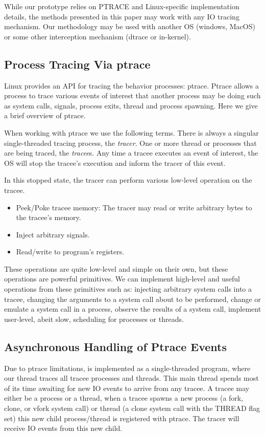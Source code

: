 While our prototype relies on PTRACE and Linux-specific implementation details, the methods presented in this paper may work with any IO tracing mechanism. Our methodology may be used with another OS (windows, MacOS) or some other interception mechanism (dtrace or in-kernel).

\subsection{Process Tracing Via ptrace}
Linux provides an API for tracing the behavior processes: ptrace. Ptrace allows a process to trace various
events of interest that another process may be doing such as system calls, signals, process exits,
thread and process spawning. Here we give a brief overview of ptrace.

When working with ptrace we use the following terms. There is always a singular single-threaded tracing process, the \textit{tracer}. One or more thread or processes that are being traced, the \textit{tracee}s. Any time a tracee executes an event of interest, the OS will stop the tracee's execution and inform the tracer of this event.

In this stopped state, the tracer can perform various low-level operation on the tracee.
\begin{itemize}
  \item Peek/Poke tracee memory: The tracer may read or write arbitrary bytes to the tracee's memory.
  \item Inject arbitrary signals.
  \item Read/write to program's registers.
\end{itemize}

These operations are quite low-level and simple on their own, but these operations are powerful
primitives. We can implement high-level and useful operations from these primitives such as:
injecting arbitrary system calls into a tracee, changing the arguments to a system call about to
be performed, change or emulate a system call in a process, observe the results of a system call,
implement user-level, abeit slow, scheduling for processes or threads.

\subsection{Asynchronous Handling of Ptrace Events}

Due to ptrace limitations, \pc is implemented as a single-threaded program, where our thread traces all
tracee processes and threads. This main thread spends most of its time awaiting for new IO events to arrive
from any tracee. A tracee may either be a process or a thread, when a tracee spawns a new process (a fork, clone, or vfork system call) or thread (a clone system call with the THREAD flag set) this new child process/thread is registered with ptrace. The tracer will receive IO events from this new child.

